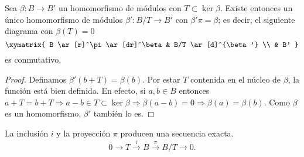 \begin{proposicion}\label{prop:first_iso}

Sea \( \beta: B \rightarrow B' \) un homomorfismo de módulos con \( T \subset \ker \beta \). Existe entonces un único homomorfismo de módulos \( \beta': B/T \rightarrow B' \) con \( \beta'\pi = \beta \); es decir, el siguiente diagrama con \( \beta(T) = 0 \)
\begin{equation}
    \label{firstisothm}
    \xymatrix{
        B \ar[r]^\pi \ar[dr]^\beta & B/T \ar[d]^{\beta'} \\
        & B'
    }
\end{equation}
es conmutativo.
\end{proposicion}

\begin{proof}
Definamos \( \beta'(b + T) = \beta(b) \). Por estar $T$ contenida en el núcleo de $\beta$, la función está bien definida. En efecto, si $a,b \in B$ entonces $a+T = b+T \Rightarrow a-b \in T \subset \ker \beta \Rightarrow \beta(a-b) = 0 \Rightarrow \beta(a)=\beta(b)$. Como $\beta$ es un homomorfismo, $\beta'$ también lo es.
\end{proof}

%
%

La inclusión \(i\) y la proyección \(\pi\) producen una secuencia exacta.
\[ 0 \rightarrow T \xrightarrow{i} B \xrightarrow{\pi} B/T \rightarrow 0. \]

